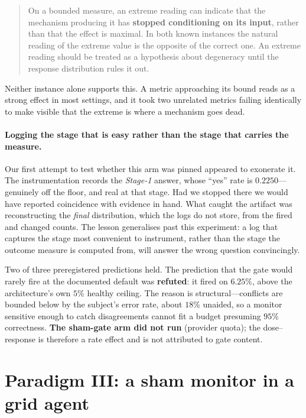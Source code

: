 \documentclass[11pt]{article}
\begin{document}
\begin{quote}
On a bounded measure, an extreme reading can indicate that the mechanism
producing it has \textbf{stopped conditioning on its input}, rather than that
the effect is maximal. In both known instances the natural reading of the
extreme value is the opposite of the correct one. An extreme reading should be
treated as a hypothesis about degeneracy until the response distribution rules
it out.
\end{quote}

\noindent
Neither instance alone supports this. A metric approaching its bound reads as a
strong effect in most settings, and it took two unrelated metrics failing
identically to make visible that the extreme is where a mechanism goes dead.

\paragraph{Logging the stage that is easy rather than the stage that carries the
measure.} Our first attempt to test whether this arm was pinned appeared to
exonerate it. The instrumentation records the \emph{Stage-1} answer, whose
``yes'' rate is $0.2250$---genuinely off the floor, and real at that stage. Had
we stopped there we would have reported coincidence with evidence in hand. What
caught the artifact was reconstructing the \emph{final} distribution, which the
logs do not store, from the fired and changed counts. The lesson generalises
past this experiment: a log that captures the stage most convenient to
instrument, rather than the stage the outcome measure is computed from, will
answer the wrong question convincingly.

Two of three preregistered predictions held. The prediction that the gate
would rarely fire at the documented default was \textbf{refuted}: it fired on
$6.25\%$, above the architecture's own $5\%$ healthy ceiling. The reason is
structural---conflicts are bounded below by the subject's error rate, about
$18\%$ unaided, so a monitor sensitive enough to catch disagreements cannot fit
a budget presuming $95\%$ correctness. \textbf{The sham-gate arm did not run}
(provider quota); the dose--response is therefore a rate effect and is not
attributed to gate content.

\section{Paradigm III: a sham monitor in a grid agent}
\end{document}
